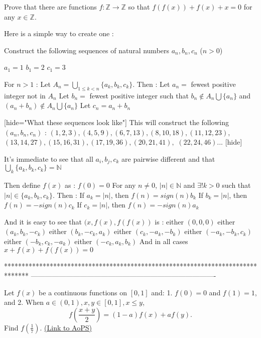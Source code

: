 \begin{solution}
	\begin{tcolorbox}Prove that there are functions $ f: \mathbb{Z} \rightarrow \mathbb{Z}$ so that $ f(f(x)) + f(x) + x = 0$ for any $ x \in \mathbb{Z}$.\end{tcolorbox}

Here is a simple way to create one :

Construct the following sequences of natural numbers $ a_n,b_n,c_n$ ($ n > 0$)

$ a_1 = 1$
$ b_1 = 2$
$ c_1 = 3$

For $ n > 1$ : Let $ A_n = \bigcup_{1\leq k < n}\{a_k,b_k,c_k\}$. Then :
Let $ a_n =$ fewest positive integer not in $ A_n$
Let $ b_n =$ fewest positive integer such that $ b_n\notin A_n\bigcup\{a_n\}$ and $ (a_n + b_n)\notin A_n\bigcup\{a_n\}$
Let $ c_n = a_n + b_n$

[hide="What these sequences look like"]
This will construct the following $ (a_n,b_n,c_n)$ : 
$ (1,2,3),(4,5,9),(6,7,13),(8,10,18),(11,12,23),$
$ (13,14,27),(15,16,31),(17,19,36),(20,21,41),$
$ (22,24,46) ...$
[\/hide]

It's immediate to see that all $ a_i,b_j,c_k$ are pairwise different and that $ \bigcup_k\{a_k,b_k,c_k\} = \mathbb N$

Then define $ f(x)$ as :
$ f(0) = 0$
For any $ n\neq 0$, $ |n|\in\mathbb N$ and $ \exists! k > 0$ such that $ |n|\in\{a_k,b_k,c_k\}$. Then :
If  $ a_k = |n|$, then $ f(n) = sign(n)b_k$
If  $ b_k = |n|$, then $ f(n) = - sign(n)c_k$
If  $ c_k = |n|$, then $ f(n) = - sign(n)a_k$

And it is easy to see that $ (x,f(x),f(f(x))$ is :
either $ (0,0,0)$
either $ (a_k,b_k, - c_k)$
either $ (b_k, - c_k,a_k)$
either $ (c_k, - a_k, - b_k)$
either $ ( - a_k, - b_k,c_k)$
either $ ( - b_k,c_k, - a_k)$
either $ ( - c_k,a_k,b_k)$
And in all cases $ x + f(x) + f(f(x)) = 0$
\end{solution}
*******************************************************************************
-------------------------------------------------------------------------------

\begin{problem}
	Let $ f(x)$ be a continuous functions on $ [0,1]$ and:
1. $ f(0) = 0$ and $f(1) = 1$, and
2. When $ a\in (0,1), x,y\in [0,1] , x\leq y$, \[ f\left(\frac {x + y}{2}\right) = (1 - a)f(x) + af(y).\]
Find $ f\left(\frac {1}{7}\right)$.
	\flushright \href{https://artofproblemsolving.com/community/c6h298763}{(Link to AoPS)}
\end{problem}



